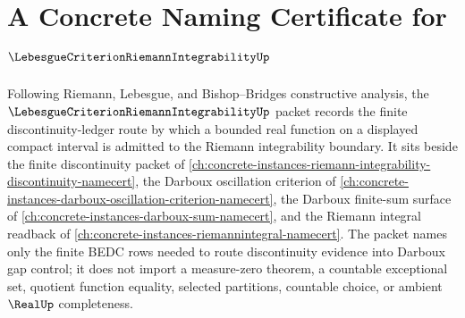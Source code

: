 \chapter{A Concrete Naming Certificate for $\LebesgueCriterionRiemannIntegrabilityUp$}
\label{ch:concrete-instances-lebesgue-criterion-riemann-integrability-namecert}

Following Riemann, Lebesgue, and Bishop--Bridges constructive analysis, the $\LebesgueCriterionRiemannIntegrabilityUp$ packet records the finite discontinuity-ledger route by which a bounded real function on a displayed compact interval is admitted to the Riemann integrability boundary. It sits beside the finite discontinuity packet of \autoref{ch:concrete-instances-riemann-integrability-discontinuity-namecert}, the Darboux oscillation criterion of \autoref{ch:concrete-instances-darboux-oscillation-criterion-namecert}, the Darboux finite-sum surface of \autoref{ch:concrete-instances-darboux-sum-namecert}, and the Riemann integral readback of \autoref{ch:concrete-instances-riemannintegral-namecert}. The packet names only the finite BEDC rows needed to route discontinuity evidence into Darboux gap control; it does not import a measure-zero theorem, a countable exceptional set, quotient function equality, selected partitions, countable choice, or ambient $\RealUp$ completeness.

